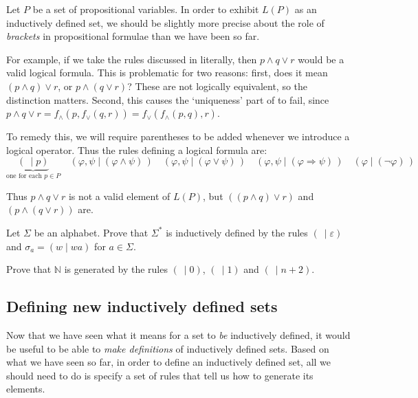 \begin{example}
\label{exInductivelyDefinedSetOfPropositionalFormulae}
Let $P$ be a set of propositional variables. In order to exhibit $L(P)$ as an inductively defined set, we should be slightly more precise about the role of \textit{brackets} in propositional formulae than we have been so far.

For example, if we take the rules discussed in  literally, then $p \wedge q \vee r$ would be a valid logical formula. This is problematic for two reasons: first, does it mean $(p \wedge q) \vee r$, or $p \wedge (q \vee r)$? These are not logically equivalent, so the distinction matters. Second, this causes the `uniqueness' part of  to fail, since $p \wedge q \vee r = f_{\wedge}(p,f_{\vee}(q,r)) = f_{\vee}(f_{\wedge}(p,q),r)$.

To remedy this, we will require parentheses to be added whenever we introduce a logical operator. Thus the rules defining a logical formula are:
\[ \underbrace{(~ \mid p)}_{\text{one for each } p \in P} \quad (\varphi,\psi \mid (\varphi \wedge \psi)\,) \quad (\varphi,\psi \mid (\varphi \vee \psi)\,) \quad (\varphi,\psi \mid (\varphi \Rightarrow \psi)\,) \quad (\varphi \mid (\neg \varphi)\,) \]

Thus $p \wedge q \vee r$ is not a valid element of $L(P)$, but $((p \wedge q) \vee r)$ and $(p \wedge (q \vee r))$ are.
\end{example}

\begin{exercise}
Let $\Sigma$ be an alphabet. Prove that $\Sigma^*$ is inductively defined by the rules $(~ \mid \varepsilon)$ and $\sigma_a = (w \mid wa)$ for $a \in \Sigma$.
\end{exercise}

\begin{exercise}
Prove that $\mathbb{N}$ is generated by the rules $(~ \mid 0)$, $(~ \mid 1)$ and $(~ \mid n+2)$.
\end{exercise}

\subsection*{Defining new inductively defined sets}

Now that we have seen what it means for a set to \textit{be} inductively defined, it would be useful to be able to \textit{make definitions} of inductively defined sets. Based on what we have seen so far, in order to define an inductively defined set, all we should need to do is specify a set of rules that tell us how to generate its elements.

